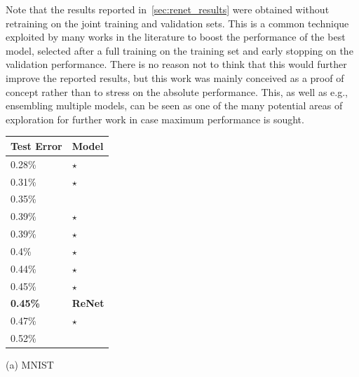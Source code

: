 Note that the results reported in~\autoref{sec:renet_results} were obtained
without retraining on the joint training and validation sets. This is a common
technique exploited by many works in the literature to boost the performance
of the best model, selected after a full training on the training set and early
stopping on the validation performance. There is no reason not to think that
this would further improve the reported results, but this work was mainly
conceived as a proof of concept rather than to stress on the absolute
performance. This, as well as e.g., ensembling multiple models, can be seen as
one of the many potential areas of exploration for further work in case maximum
performance is sought.

\begin{table}[t]
    \centering

    \begin{minipage}{0.45\textwidth}
        \centering

        \begin{tabular}{l |  l}
            Test Error & Model  \\
            \hline
0.28\% & \citep{DBLP:conf/icml/WanZZLF13}$\star$ \\
0.31\% & \citep{DBLP:journals/corr/Graham14}$\star$ \\
0.35\% & \citep{DBLP:journals/corr/abs-1003-0358} \\
0.39\% & \citep{DBLP:conf/nips/MairalKHS14}$\star$ \\
0.39\% & \citep{DBLP:journals/corr/LeeXGZT14}$\star$ \\
0.4\% & \citep{DBLP:conf/icdar/SimardSP03}$\star$ \\
0.44\% & \citep{DBLP:journals/corr/Graham14a}$\star$ \\
0.45\% & \citep{Goodfellow2013}$\star$ \\
\bf{0.45\%} & \bf{ReNet} \\
0.47\% & \citep{Lin2014}$\star$ \\
0.52\% & \citep{DBLP:journals/pami/AzzopardiA13} \\
        \end{tabular}

            \vspace{2mm}
            (a) MNIST
        \end{minipage}
        \hfill
        \begin{minipage}{0.45\textwidth}
            \centering


\end{minipage}
\end{table}
